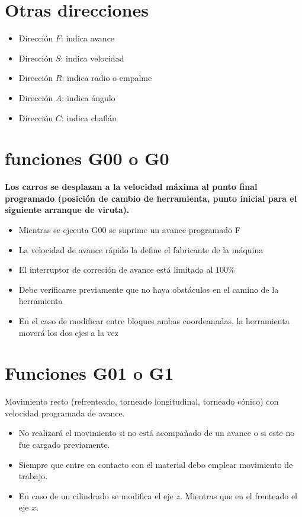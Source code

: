 \documentclass{article}
\begin{document}
\section{Otras direcciones}

\begin{itemize}
    \item Dirección $F$: indica avance
    \item Dirección $S$: indica velocidad
    \item Dirección $R$: indica radio o empalme
    \item Dirección $A$: indica ángulo
    \item Dirección $C$: indica chaflán
\end{itemize}

\section{funciones G00 o G0}
\textbf{Los carros se desplazan a la velocidad máxima al punto final programado (posición de cambio de herramienta, punto inicial para el siguiente arranque de viruta).}
\begin{itemize}
    \item Mientras se ejecuta G00 se suprime un avance programado F
    \item La velocidad de avance rápido la define el fabricante de la máquina
    \item El interruptor de correción de avance está limitado al $100\%$
    \item Debe verificarse previamente que no haya obstáculos en el camino de la
          herramienta
    \item En el caso de modificar entre bloques ambas coordeanadas, la herramienta moverá
          los dos ejes a la vez
\end{itemize}

\section{Funciones G01 o G1}

Movimiento recto (refrenteado, torneado longitudinal, torneado cónico) con
velocidad programada de avance.

\begin{itemize}
    \item No realizará el movimiento si no está acompañado de un avance o si este no fue
          cargado previamente.
    \item Siempre que entre en contacto con el material debo emplear movimiento de
          trabajo.
    \item En caso de un cilindrado se modifica el eje $z$. Mientras que en el frenteado
          el eje $x$.
\end{itemize}
\end{document}
